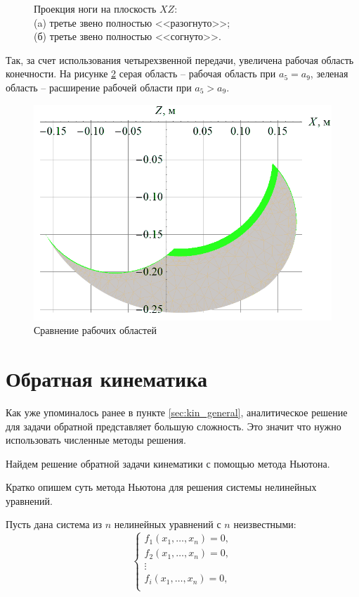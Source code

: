 \begin{figure}[ht]
    \captionsetup{justification=centering}
    \caption{Проекция ноги на плоскость $ XZ $: \\ (a) третье звено полностью <<разогнуто>>; \\ (б) третье звено полностью <<согнуто>>.}
    \label{fig:leg_model}
\end{figure}

Так, за счет использования четырехзвенной передачи, увеличена рабочая область конечности. На рисунке \ref{fig:fig7} серая область -- рабочая область при $ a_5 = a_9 $, зеленая область -- расширение рабочей области при $ a_5 > a_9 $.
\begin{figure}[h]
    \centering
    \includegraphics[scale=0.8]{chapter_kinematics/figure8.png}
    \caption{Сравнение рабочих областей}
    \label{fig:fig7}
\end{figure}

\section{Обратная кинематика} \label{sec:inverse_kin}
Как уже упоминалось ранее в пункте \ref{sec:kin_general}, аналитическое решение для задачи обратной представляет большую сложность. Это значит что нужно использовать численные методы решения.

Найдем решение обратной задачи кинематики с помощью метода Ньютона.

Кратко опишем суть метода Ньютона для решения системы нелинейных уравнений. 

Пусть дана система из $ n $ нелинейных уравнений с $ n $ неизвестными:
\[
\left\{ 
\begin{array}{c}
    f_1(x_1, \dots, x_n) = 0, \\
    f_2(x_1, \dots, x_n) = 0, \\
    \vdots \\
    f_i(x_1, \dots, x_n) = 0, \\
\end{array} 
\right.
\]

